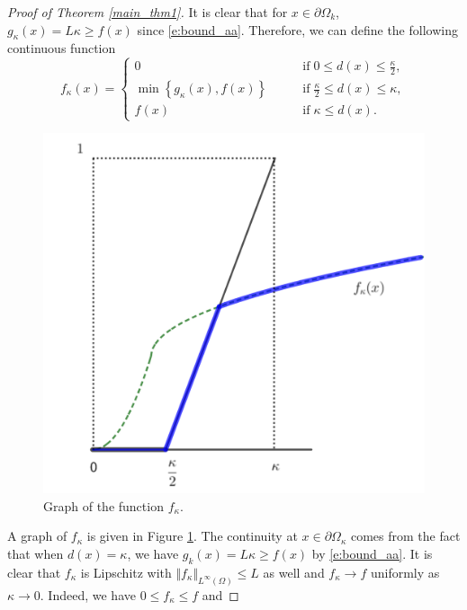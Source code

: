 \documentclass[12pt,reqno]{amsart}
\numberwithin{figure}{section}
\theoremstyle{plain}
\theoremstyle{remark}
\numberwithin{equation}{section}
\begin{document}
\begin{proof}[Proof of Theorem \ref{main_thm1}]
\noindent
It is clear that for $x\in \partial\Omega_k$, $g_\kappa(x) = L\kappa \geq f(x)$ since \eqref{e:bound_aa}. Therefore, we can define the following continuous function
\begin{equation*}
    f_\kappa(x) = 
    \begin{cases}
        0             &\qquad\text{if}\;0\leq d(x) \leq \frac{\kappa}{2},\\
        \min \left\lbrace g_\kappa(x), f(x) \right\rbrace &\qquad\text{if}\;\frac{\kappa}{2}\leq d(x) \leq \kappa,\\
        f(x) &\qquad\text{if}\;\kappa \leq d(x).
    \end{cases}
\end{equation*}
\begin{figure}[h]
    \centering
    \includegraphics[scale=0.40]{Drafts and notes/fig1.png}
    \caption{Graph of the function $f_\kappa$.}
    \label{fig:f_kappa}
\end{figure}
A graph of $f_\kappa$ is given in Figure \ref{fig:f_kappa}. The continuity at $x\in \partial\Omega_\kappa$ comes from the fact that when $d(x) =\kappa$, we have $g_k(x) = L\kappa \geq f(x)$ by \eqref{e:bound_aa}. It is clear that $f_\kappa$ is Lipschitz with $\Vert f_\kappa\Vert_{L^\infty(\Omega)}\leq L$ as well and $f_\kappa\to f$ uniformly as $\kappa\to 0$. Indeed, we have $0\leq f_\kappa \leq f$ and

\end{proof}
\end{document}
